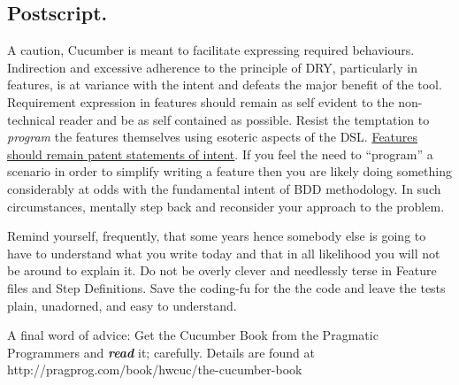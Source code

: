 \subsection{Postscript.}

A caution, Cucumber is meant to facilitate expressing required behaviours.  Indirection and excessive adherence to the principle of DRY, particularly in features, is at variance with the intent and defeats the major benefit of the tool.  Requirement expression in features should remain as self evident to the non-technical reader and be as self contained as possible.  Resist the temptation to \emph{program} the features themselves using esoteric aspects of the DSL.  \href{http://mislav.uniqpath.com/2010/09/cuking-it-right/}{Features should remain patent statements of intent}.  If you feel the need to ``program'' a scenario in order to simplify writing a feature then you are likely doing something considerably at odds with the fundamental intent of BDD methodology.  In such circumstances, mentally step back and reconsider your approach to the problem.

Remind yourself, frequently, that some years hence somebody else is going to have to understand what you write today and that in all likelihood you will not be around to explain it.  Do not be overly clever and needlessly terse in Feature files and Step Definitions.  Save the coding-fu for the the code and leave the tests plain, unadorned, and easy to understand.

A final word of advice: Get the Cucumber Book from the Pragmatic Programmers and \textbf{\emph{read}} it; carefully.  Details are found at http://pragprog.com/book/hwcuc/the-cucumber-book
